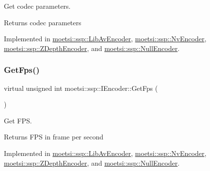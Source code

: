Get codec parameters. 

\begin{DoxyReturn}{Returns}
codec parameters 
\end{DoxyReturn}


Implemented in \hyperlink{classmoetsi_1_1ssp_1_1LibAvEncoder_a2ff6afafbb5da48e900d34d70a46d00c}{moetsi\+::ssp\+::\+Lib\+Av\+Encoder}, \hyperlink{classmoetsi_1_1ssp_1_1NvEncoder_aa6229a43b12d2f27e27f518fc2229b61}{moetsi\+::ssp\+::\+Nv\+Encoder}, \hyperlink{classmoetsi_1_1ssp_1_1ZDepthEncoder_a3fc9f84387dba09d1deb4761031b598f}{moetsi\+::ssp\+::\+Z\+Depth\+Encoder}, and \hyperlink{classmoetsi_1_1ssp_1_1NullEncoder_a29839bd02ad42ecd9cf8e6cce707a9fe}{moetsi\+::ssp\+::\+Null\+Encoder}.

\mbox{\label{classmoetsi_1_1ssp_1_1IEncoder_ae6a865aa52230d81aed1cb5232402f6c}} 
\subsubsection{\texorpdfstring{Get\+Fps()}{GetFps()}\hspace{0.1cm}{\footnotesize\ttfamily [1/2]}}
{\footnotesize\ttfamily virtual unsigned int moetsi\+::ssp\+::\+I\+Encoder\+::\+Get\+Fps (\begin{DoxyParamCaption}{ }\end{DoxyParamCaption})\hspace{0.3cm}{\ttfamily [pure virtual]}}



Get F\+PS. 

\begin{DoxyReturn}{Returns}
F\+PS in frame per second 
\end{DoxyReturn}


Implemented in \hyperlink{classmoetsi_1_1ssp_1_1LibAvEncoder_ae21f81cb967359132183a29e04307933}{moetsi\+::ssp\+::\+Lib\+Av\+Encoder}, \hyperlink{classmoetsi_1_1ssp_1_1NvEncoder_ab94b826f2aef05afad376132743001d9}{moetsi\+::ssp\+::\+Nv\+Encoder}, \hyperlink{classmoetsi_1_1ssp_1_1ZDepthEncoder_a9ea0a5783d7d265fccc3a2c262600552}{moetsi\+::ssp\+::\+Z\+Depth\+Encoder}, and \hyperlink{classmoetsi_1_1ssp_1_1NullEncoder_ad6727fa08528622081aa4eca4aacc6c1}{moetsi\+::ssp\+::\+Null\+Encoder}.

\mbox{\label{classmoetsi_1_1ssp_1_1IEncoder_ae6a865aa52230d81aed1cb5232402f6c}} 
